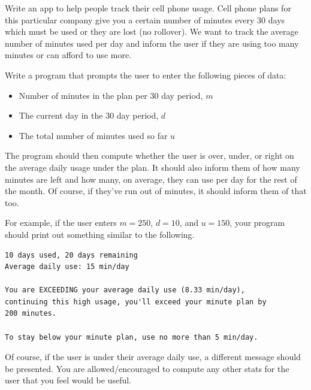 \begin{exer}
Write an app to help people track their cell phone usage.  Cell 
phone plans for this particular company give you a certain number of minutes
every 30 days which must be used or they are lost (no rollover).  We want
to track the average number of minutes used per day and inform the user
if they are using too many minutes or can afford to use more.

Write a program that prompts the user to enter the following pieces of data:
\begin{itemize}
  \item Number of minutes in the plan per 30 day period, $m$
  \item The current day in the 30 day period, $d$
  \item The total number of minutes used so far $u$
\end{itemize}
The program should then compute whether the user is over, under, or 
right on the average daily usage under the plan.  It should also inform
them of how many minutes are left and how many, on average, they can
use per day for the rest of the month.  Of course, if they've run out of minutes, it
should inform them of that too.

For example, if the user enters $m = 250$, $d = 10$, and $u = 150$, your
program should print out something similar to the following.

\begin{verbatim}
10 days used, 20 days remaining
Average daily use: 15 min/day

You are EXCEEDING your average daily use (8.33 min/day), 
continuing this high usage, you'll exceed your minute plan by
200 minutes.

To stay below your minute plan, use no more than 5 min/day.
\end{verbatim}

Of course, if the user is under their average daily use, a different
message should be presented.  You are allowed/encouraged to 
compute any other stats for the user that you feel would be useful.
\end{exer}



